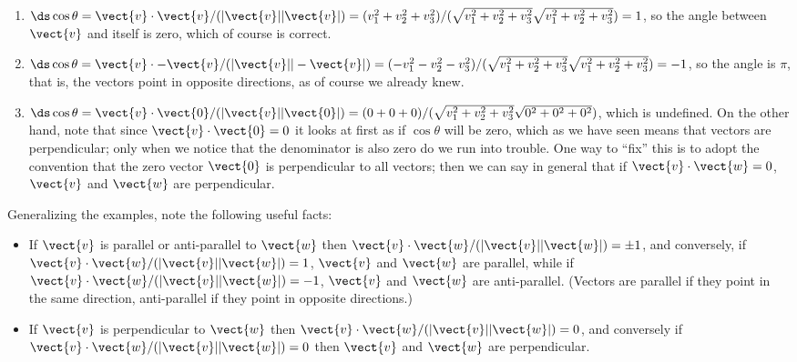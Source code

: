 \begin{solution}
\begin{enumerate}
\item
$\ds \cos\theta= \vect{v}\cdot\vect{v}/(|\vect{v}||\vect{v}|)=(v_1^2+v_2^2+v_3^2)/
(\sqrt{v_1^2+v_2^2+v_3^2}\sqrt{v_1^2+v_2^2+v_3^2})=1$, so the angle
between $\vect{v}$ and itself is zero, which of course is correct.

\item
$\ds\cos\theta=\vect{v}\cdot-\vect{v}/(|\vect{v}||-\vect{v}|)=(-v_1^2-v_2^2-v_3^2)/
(\sqrt{v_1^2+v_2^2+v_3^2}\sqrt{v_1^2+v_2^2+v_3^2})=-1$, so the angle
is $\pi$, that is, the vectors point in opposite directions, as of
course we already knew.

\item
$\ds \cos\theta= \vect{v}\cdot\vect{0}/(|\vect{v}||\vect{0}|)=(0+0+0)/
(\sqrt{v_1^2+v_2^2+v_3^2}\sqrt{0^2+0^2+0^2})$, which is undefined.
On the other hand, note that since $\vect{v}\cdot\vect{0}=0$ it looks
at first as if $\cos\theta$ will be zero, which as we have seen means
that vectors are perpendicular; only when we notice that the
denominator is also zero do we run into trouble. One way to ``fix''
this is to adopt the convention that the zero vector $\vect{0}$ is
perpendicular to all vectors; then we can say in general that if
$\vect{v}\cdot\vect{w}=0$, $\vect{v}$ and $\vect{w}$ are perpendicular.
\end{enumerate}
\end{solution}

Generalizing the examples, note the following useful facts:

\begin{itemize}
	\item	If $\vect{v}$ is parallel or anti-parallel to $\vect{w}$ then
	$\vect{v}\cdot\vect{w}/(|\vect{v}||\vect{w}|)=\pm1$, and conversely, if
	$\vect{v}\cdot\vect{w}/(|\vect{v}||\vect{w}|)=1$, $\vect{v}$ and $\vect{w}$	are parallel, while if $\vect{v}\cdot\vect{w}/(|\vect{v}||\vect{w}|)=-1$, $\vect{v}$ and $\vect{w}$ are anti-parallel. (Vectors are
	parallel if they point in the same direction,
	anti-parallel if they point in opposite directions.) 
	\item	If $\vect{v}$ is perpendicular to $\vect{w}$ then 
	$\vect{v}\cdot\vect{w}/(|\vect{v}||\vect{w}|)=0$, and conversely if 
	$\vect{v}\cdot\vect{w}/(|\vect{v}||\vect{w}|)=0$ then 
	$\vect{v}$ and $\vect{w}$ are perpendicular. 
\end{itemize}

